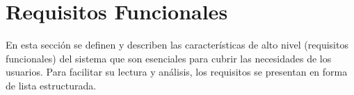 
\chapter{Requisitos Funcionales}


En esta sección se definen y describen las características de alto nivel (requisitos funcionales) del sistema que son esenciales para cubrir las necesidades de los usuarios. Para facilitar su lectura y análisis, los requisitos se presentan en forma de lista estructurada.
\\ \\






